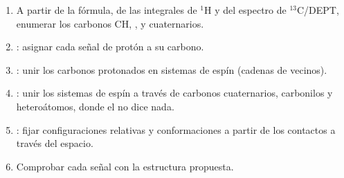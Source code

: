 \begin{method}\label{met:b3:advanced-nmr:solve-2d}
\begin{enumerate}
  \item A partir de la fórmula, de las integrales de ${}^1$H y del espectro de ${}^{13}$C/DEPT, enumerar
        los carbonos CH, ,  y cuaternarios.
  \item {}: asignar cada señal de protón a su carbono.
  \item {}: unir los carbonos protonados en sistemas de espín (cadenas de
        vecinos).
  \item {}: unir los sistemas de espín a través de carbonos cuaternarios, carbonilos y
        heteroátomos, donde el  no dice nada.
  \item {}: fijar configuraciones relativas y conformaciones a partir de los
        contactos a través del espacio.
  \item Comprobar cada señal con la estructura propuesta.
\end{enumerate}
\end{method}

